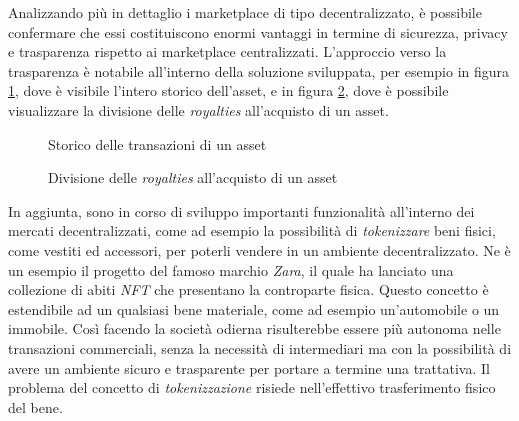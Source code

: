 Analizzando più in dettaglio i marketplace di tipo decentralizzato, è possibile confermare che essi costituiscono enormi vantaggi in termine di sicurezza, privacy e trasparenza rispetto ai marketplace centralizzati. L'approccio verso la trasparenza è notabile all'interno della soluzione sviluppata, per esempio in figura \ref{fig:risultati_storico}, dove è visibile l'intero storico dell'asset, e in figura \ref{fig:risulati_royalty}, dove è possibile visualizzare la divisione delle \textit{royalties} all'acquisto di un asset.

\begin{figure}[H]
    \centering
    \caption{Storico delle transazioni di un asset}
    \label{fig:risultati_storico}
\end{figure}

\begin{figure}[H]
    \centering
    \caption{Divisione delle \textit{royalties} all'acquisto di un asset}  
    \label{fig:risulati_royalty}
\end{figure}

In aggiunta, sono in corso di sviluppo importanti funzionalità all'interno dei mercati decentralizzati, come ad esempio la possibilità di \textit{tokenizzare} beni fisici, come vestiti ed accessori, per poterli vendere in un ambiente decentralizzato. Ne è un esempio il progetto del famoso marchio \textit{Zara}, il quale ha lanciato una collezione di abiti \textit{NFT} che presentano la controparte fisica.  Questo concetto è estendibile ad un qualsiasi bene materiale, come ad esempio un'automobile o un immobile. \cite{belk2022money} Così facendo la società odierna risulterebbe essere più autonoma nelle transazioni commerciali, senza la necessità di intermediari ma con la possibilità di avere un ambiente sicuro e trasparente per portare a termine una trattativa. Il problema del concetto di \textit{tokenizzazione} risiede nell'effettivo trasferimento fisico del bene. 

